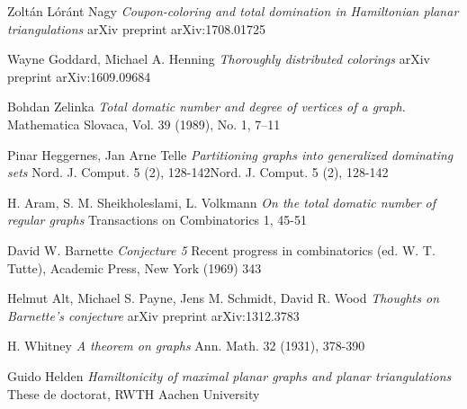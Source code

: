 \begin{thebibliography}{9}

Zoltán Lóránt Nagy
\textit{Coupon-coloring and total domination in Hamiltonian planar triangulations}
arXiv preprint arXiv:1708.01725

Wayne Goddard, Michael A. Henning
\textit{Thoroughly distributed colorings}
arXiv preprint arXiv:1609.09684

Bohdan Zelinka
\textit{Total domatic number and degree of vertices of a graph}.
Mathematica Slovaca, Vol. 39 (1989), No. 1, 7--11

Pinar Heggernes, Jan Arne Telle
\textit{Partitioning graphs into generalized dominating sets}
Nord. J. Comput. 5 (2), 128-142Nord. J. Comput. 5 (2), 128-142

H. Aram, S. M. Sheikholeslami, L. Volkmann
\textit{On the total domatic number of regular graphs}
Transactions on Combinatorics 1, 45-51

David W. Barnette
\textit{Conjecture 5}
Recent progress in combinatorics (ed. W. T. Tutte), Academic Press, New York (1969) 343

Helmut Alt, Michael S. Payne, Jens M. Schmidt, David R. Wood
\textit{Thoughts on Barnette's conjecture}
arXiv preprint arXiv:1312.3783

H. Whitney
\textit{A theorem on graphs}
Ann. Math. 32 (1931), 378-390

Guido Helden
\textit{Hamiltonicity of maximal planar graphs and planar triangulations}
These de doctorat, RWTH Aachen University

\end{thebibliography}
